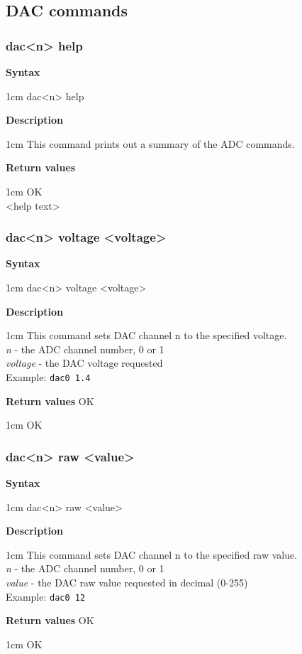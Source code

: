 \documentclass{article}[a4paper]
\begin{document}
\subsection{DAC commands}
\subsubsection{dac<n> help}
\begin{tcolorbox}
	{\bf Syntax}

	 1cm \dimexpr\linewidth-2cm\relax
	dac<n> help

	\medskip
	{\bf Description}

	 1cm \dimexpr\linewidth-2cm\relax
	This command prints out a summary of the ADC commands.

	\medskip
	{\bf Return values}

	 1cm \dimexpr\linewidth-2cm\relax
	OK \\
	<help text>
\end{tcolorbox}

\subsubsection{dac<n> voltage <voltage>}
\begin{tcolorbox}
	{\bf Syntax}

	 1cm \dimexpr\linewidth-2cm\relax
	dac<n> voltage <voltage>

	\medskip
	{\bf Description}

	 1cm \dimexpr\linewidth-2cm\relax
	This command sets DAC channel n to the specified voltage. \\
	\medskip
	{\it n} - the ADC channel number, 0 or 1 \\
	{\it voltage} - the DAC voltage requested \\
	\medskip
	Example: \texttt{dac0 1.4}

	\medskip
	{\bf Return values}
	OK

	 1cm \dimexpr\linewidth-2cm\relax
	OK
\end{tcolorbox}

\subsubsection{dac<n> raw <value>}
\begin{tcolorbox}
	{\bf Syntax}

	 1cm \dimexpr\linewidth-2cm\relax
	dac<n> raw <value>

	\medskip
	{\bf Description}

	 1cm \dimexpr\linewidth-2cm\relax
	This command sets DAC channel n to the specified raw value. \\
	\medskip
	{\it n} - the ADC channel number, 0 or 1 \\
	{\it value} - the DAC raw value requested in decimal (0-255) \\
	\medskip
	Example: \texttt{dac0 12}

	\medskip
	{\bf Return values}
	OK

	 1cm \dimexpr\linewidth-2cm\relax
	OK
\end{tcolorbox}
\end{document}
